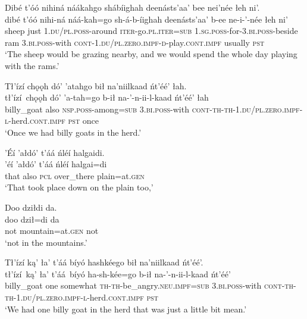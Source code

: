 \ea\label{ex:text6-6-8}
Dibé t’óó nihiná náákahgo shábíighah deenásts’aa’ bee nei’née łeh ni’.\\
\gll dibé	t’óó	nihi-ná	náá-kah=go	sh-á-b-íighah	deenásts’aa’	b-ee	ne-i-’-née	łeh	ni’\\
     sheep	just	1.\textsc{du}/\textsc{pl}.\textsc{poss}-around	\textsc{iter}-go.\textsc{pl}.\textsc{iter}=\textsc{sub}	1.\textsc{sg}.\textsc{poss}-for-3.\textsc{bi}.\textsc{poss}-beside	ram	3.\textsc{bi}.\textsc{poss}-with	\textsc{cont}-1.\textsc{du}/\textsc{pl}.\textsc{zero}.\textsc{impf}-\textsc{d}-play.\textsc{cont}.\textsc{impf}	usually	\textsc{pst}\\
\glt `The sheep would be grazing nearby, and we would spend the whole day playing with the rams.'
\z

\ea\label{ex:text6-7-1}
Tł’ízí chǫǫh dó’ ’atahgo bił na’niilkaad ńt’éé’ łah.\\
\gll tł’ízí~{chǫǫh}	dó’	’a-tah=go	b-ił	na-’-n-ii-l-kaad	ńt’éé’	łah\\
     billy\_goat	also	\textsc{nsp}.\textsc{poss}-among=\textsc{sub}	3.\textsc{bi}.\textsc{poss}-with	\textsc{cont}-\textsc{th}-\textsc{th}-1.\textsc{du}/\textsc{pl}.\textsc{zero}.\textsc{impf}-\textsc{l}-herd.\textsc{cont}.\textsc{impf}	\textsc{pst}	once\\
\glt `Once we had billy goats in the herd.'
\z

\ea\label{ex:text6-7-2}
’Éí ’ałdó’ t’áá ńléí halgaidi.\\
\gll ’éí	’ałdó’	t’áá	ńléí	halgai=di\\
     that	also	\textsc{pcl}	over\_there	plain=at.\textsc{gen}\\
\glt `That took place down on the plain too,'
\z

\ea\label{ex:text6-7-3}
Doo dziłdi da.\\
\gll doo	dził=di	da\\
     not	mountain=at.\textsc{gen}	not\\
\glt `not in the mountains.'
\z

\newpage
\ea\label{ex:text6-7-4}
Tł’ízí ką’ ła’ t’áá bíyó hashkéego bił na’niilkaad ńt’éé’.\\
\gll tł’ízí~{ką’}	ła’	t’áá~{bíyó}	ha-sh-kée=go	b-ił	na-’-n-ii-l-kaad	ńt’éé’\\
     billy\_goat	one	somewhat	\textsc{th}-\textsc{th}-be\_angry.\textsc{neu}.\textsc{impf}=\textsc{sub}	3.\textsc{bi}.\textsc{poss}-with	\textsc{cont}-\textsc{th}-\textsc{th}-1.\textsc{du}/\textsc{pl}.\textsc{zero}.\textsc{impf}-\textsc{l}-herd.\textsc{cont}.\textsc{impf}	\textsc{pst}\\
\glt `We had one billy goat in the herd that was just a little bit mean.'
\z

